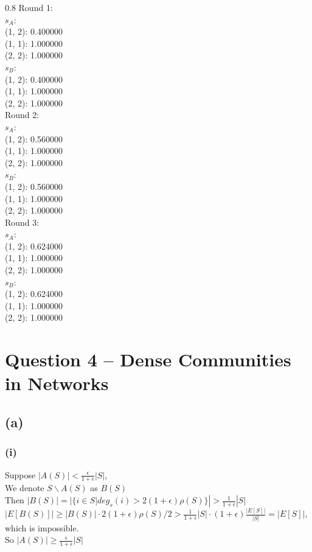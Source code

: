 \documentclass{article}
\newenvironment{myenv}[1]
  {\begin{spacing}{#1}}
  {\end{spacing}}
\begin{document}
\begin{myenv}{0.8}
Round 1:\\ 
$s_A$:\\
(1, 2): 0.400000 \\
(1, 1): 1.000000 \\
(2, 2): 1.000000 \\
$s_B$:\\
(1, 2): 0.400000 \\
(1, 1): 1.000000 \\
(2, 2): 1.000000 \\
Round 2:\\ 
$s_A$:\\
(1, 2): 0.560000 \\
(1, 1): 1.000000 \\
(2, 2): 1.000000 \\
$s_B$:\\
(1, 2): 0.560000 \\
(1, 1): 1.000000 \\
(2, 2): 1.000000 \\
Round 3:\\ 
$s_A$:\\
(1, 2): 0.624000 \\
(1, 1): 1.000000 \\
(2, 2): 1.000000 \\
$s_B$:\\
(1, 2): 0.624000 \\
(1, 1): 1.000000 \\
(2, 2): 1.000000 \\
\end{myenv}


\section{Question 4 -- Dense Communities in Networks}
\subsection{(a)}
\subsubsection{(i)}
Suppose $|A(S)| < \frac{\epsilon}{1+\epsilon}|S|$, \\
We denote $S\backslash A(S)$ as $B(S)$ \\
Then $|B(S)| = |\{i \in S | deg_s(i) > 2(1 + \epsilon)\rho(S)\}| > \frac{1}{1 + \epsilon}|S|$ \\
$|E[B(S)]| \ge |B(S)| \cdot 2(1 + \epsilon)\rho(S)/2 > \frac{1}{1 + \epsilon}|S| \cdot (1 + \epsilon)\frac{|E[S]|}{|S|} = |E[S]|$, which is impossible. \\
So $|A(S)| \ge \frac{\epsilon}{1+\epsilon}|S|$
\end{document}
